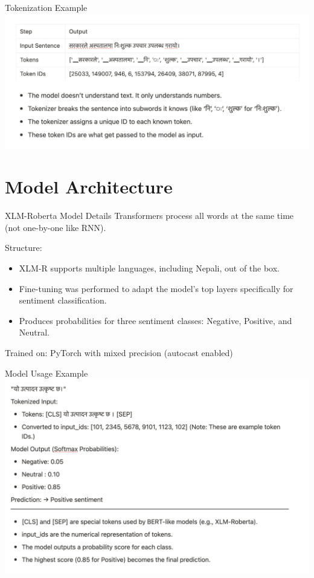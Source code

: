 \documentclass[aspectratio=169]{beamer}
\begin{document}
\begin{frame}{Tokenization Example}
  \centering
  \includegraphics[width=1\linewidth]{example.png}
\end{frame}

\section{Model Architecture}
\begin{frame}{XLM-Roberta Model Details}
  Transformers process all words at the same time (not one-by-one like RNN).

  Structure:
  \begin{itemize}
    \item XLM-R supports multiple languages, including Nepali, out of the box.
    \item Fine-tuning was performed to adapt the model's top layers specifically for sentiment classification.
    \item Produces probabilities for three sentiment classes: Negative, Positive, and Neutral.
  \end{itemize}

  Trained on: PyTorch with mixed precision (autocast enabled)
\end{frame}

\begin{frame}{Model Usage Example}
  \centering
  \includegraphics[width=0.85\linewidth]{example2.png}
\end{frame}
\end{document}
